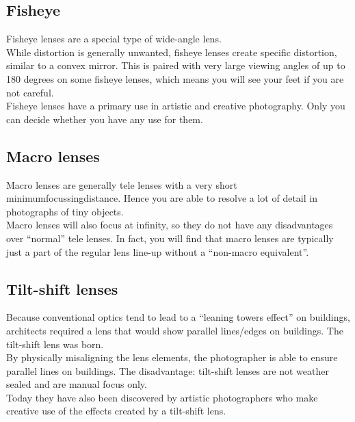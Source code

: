 \subsection{Fisheye}
Fisheye lenses are a special type of wide-angle lens.
\\
While distortion is generally unwanted, fisheye lenses create specific distortion, similar to a convex mirror. This is paired with very large viewing angles of up to 180 degrees on some fisheye lenses, which means you will see your feet if you are not careful.
\\
Fisheye lenses have a primary use in artistic and creative photography. Only you can decide whether you have any use for them.

\subsection{Macro lenses}
Macro lenses are generally tele lenses with a very short \gls{minimumfocussingdistance}. Hence you are able to resolve a lot of detail in photographs of tiny objects.
\\
Macro lenses will also focus at infinity, so they do not have any disadvantages over ``normal'' tele lenses. In fact, you will find that macro lenses are typically just a part of the regular lens line-up without a ``non-macro equivalent''.

\subsection{Tilt-shift lenses}
Because conventional optics tend to lead to a ``leaning towers effect'' on buildings, architects required a lens that would show parallel lines/edges on buildings. The tilt-shift lens was born.
\\
By physically misaligning the lens elements, the photographer is able to ensure parallel lines on buildings. The disadvantage: tilt-shift lenses are not weather sealed and are manual focus only.
\\
Today they have also been discovered by artistic photographers who make creative use of the effects created by a tilt-shift lens.

